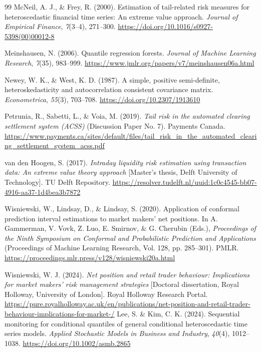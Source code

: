 \documentclass[11pt,a4paper]{article}
\begin{document}
\begin{thebibliography}{99}
 McNeil, A. J., \& Frey, R. (2000). Estimation of tail-related risk measures for heteroscedastic financial time series: An extreme value approach. \emph{Journal of Empirical Finance}, \emph{7}(3--4), 271--300. \url{https://doi.org/10.1016/s0927-5398(00)00012-8}

 Meinshausen, N. (2006). Quantile regression forests. \emph{Journal of Machine Learning Research}, \emph{7}(35), 983--999. \url{https://www.jmlr.org/papers/v7/meinshausen06a.html}

 Newey, W. K., \& West, K. D. (1987). A simple, positive semi-definite, heteroskedasticity and autocorrelation consistent covariance matrix. \emph{Econometrica}, \emph{55}(3), 703--708. \url{https://doi.org/10.2307/1913610}

 Petrunia, R., Sabetti, L., \& Voia, M. (2019). \emph{Tail risk in the automated clearing settlement system (ACSS)} (Discussion Paper No. 7). Payments Canada. \url{https://www.payments.ca/sites/default/files/tail_risk_in_the_automated_clearing_settlement_system_acss.pdf}

 van den Hoogen, S. (2017). \emph{Intraday liquidity risk estimation using transaction data: An extreme value theory approach} [Master's thesis, Delft University of Technology]. TU Delft Repository. \url{https://resolver.tudelft.nl/uuid:1c0c4545-bb07-4916-aa37-1d4bea3b7872}

 Wisniewski, W., Lindsay, D., \& Lindsay, S. (2020). Application of conformal prediction interval estimations to market makers' net positions. In A. Gammerman, V. Vovk, Z. Luo, E. Smirnov, \& G. Cherubin (Eds.), \emph{Proceedings of the Ninth Symposium on Conformal and Probabilistic Prediction and Applications} (Proceedings of Machine Learning Research, Vol. 128, pp. 285--301). PMLR. \url{https://proceedings.mlr.press/v128/wisniewski20a.html}

 Wisniewski, W. J. (2024). \emph{Net position and retail trader behaviour: Implications for market makers' risk management strategies} [Doctoral dissertation, Royal Holloway, University of London]. Royal Holloway Research Portal. \url{https://pure.royalholloway.ac.uk/en/publications/net-position-and-retail-trader-behaviour-implications-for-market-/}
 Lee, S. \& Kim, C. K. (2024). Sequential monitoring for conditional quantiles of general conditional heteroscedastic time series models. \emph{Applied Stochastic Models in Business and Industry}, \emph{40}(4), 1012--1038. \url{https://doi.org/10.1002/asmb.2865}


\end{thebibliography}
\end{document}
